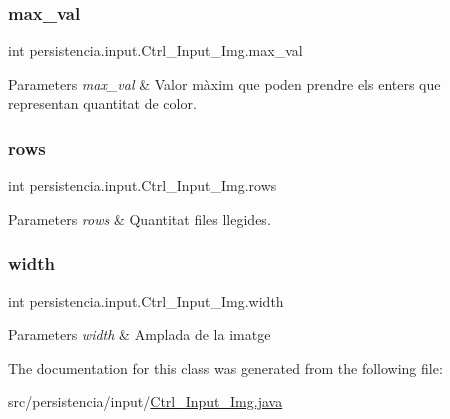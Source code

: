 \subsubsection{\texorpdfstring{max\+\_\+val}{max\_val}}
{\footnotesize\ttfamily int persistencia.\+input.\+Ctrl\+\_\+\+Input\+\_\+\+Img.\+max\+\_\+val\hspace{0.3cm}{\ttfamily [package]}}


\begin{DoxyParams}{Parameters}
{\em max\+\_\+val} & Valor màxim que poden prendre els enters que representan quantitat de color. \\
\hline
\end{DoxyParams}
\mbox{\label{classpersistencia_1_1input_1_1Ctrl__Input__Img_a1288870f941a6730df2aadbb767f6e6f}} 
\subsubsection{\texorpdfstring{rows}{rows}}
{\footnotesize\ttfamily int persistencia.\+input.\+Ctrl\+\_\+\+Input\+\_\+\+Img.\+rows\hspace{0.3cm}{\ttfamily [package]}}


\begin{DoxyParams}{Parameters}
{\em rows} & Quantitat files llegides. \\
\hline
\end{DoxyParams}
\mbox{\label{classpersistencia_1_1input_1_1Ctrl__Input__Img_a51dd0b9243b854aa25ac4532acca4524}} 
\subsubsection{\texorpdfstring{width}{width}}
{\footnotesize\ttfamily int persistencia.\+input.\+Ctrl\+\_\+\+Input\+\_\+\+Img.\+width\hspace{0.3cm}{\ttfamily [package]}}


\begin{DoxyParams}{Parameters}
{\em width} & Amplada de la imatge \\
\hline
\end{DoxyParams}


The documentation for this class was generated from the following file\+:\begin{DoxyCompactItemize}
\item 
src/persistencia/input/\hyperlink{Ctrl__Input__Img_8java}{Ctrl\+\_\+\+Input\+\_\+\+Img.\+java}\end{DoxyCompactItemize}
